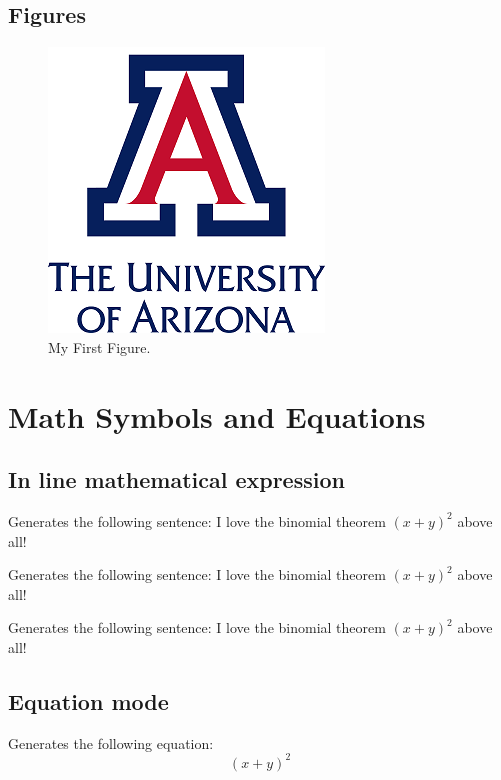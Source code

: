 \documentclass[12pt,letterpaper]{article}
\begin{document}
\subsection{Figures}


\begin{figure}[H]
  \centering
  \includegraphics{image1.png}
  \caption{My First Figure.}
  \label{fig:figure1}
\end{figure}


\section{Math Symbols and Equations}

\subsection{In line mathematical expression}

Generates the following sentence: I  love the binomial theorem \((x + y)^{2}\) above all!

Generates the following sentence: I  love the binomial theorem $(x + y)^{2}$ above all!

Generates the following sentence: I  love the binomial theorem \begin{math}(x + y)^{2}\end{math} above all!

\subsection{Equation mode}

Generates the following equation:
\[ (x + y)^{2} \]
\end{document}
